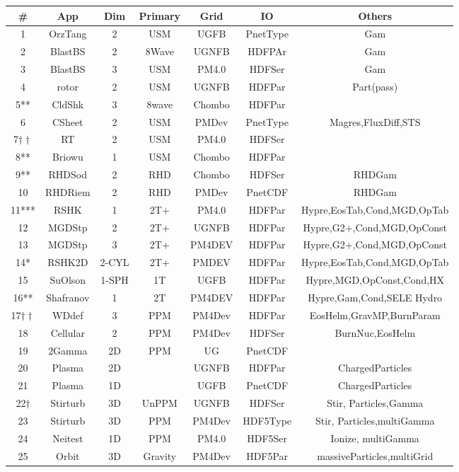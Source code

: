 \documentclass[10pt]{article}
\begin{document}
\begin{tabular}{|c|c|c|c|c|c|c|}\hline
\# &App&Dim&Primary&Grid&IO&Others\\\hline
1&OrzTang&2&USM&UGFB&PnetType&Gam\\\hline
2&BlastBS&2&8Wave&UGNFB&HDFPAr&Gam\\\hline
3&BlastBS&3&USM&PM4.0&HDFSer&Gam\\\hline
4&rotor&2&USM&UGNFB&HDFPar&Part(pass)\\\hline
5**&CldShk&3&8wave&Chombo&HDFPar&\\\hline
6&CSheet&2&USM&PMDev&PnetType&Magres,FluxDiff,STS\\\hline
7$\dagger\dagger$&RT&2&USM&PM4.0&HDFSer&\\\hline
8**&Briowu&1&USM&Chombo&HDFPar&\\\hline
9**&RHDSod&2&RHD&Chombo&HDFSer&RHDGam\\\hline
10&RHDRiem&2&RHD&PMDev&PnetCDF&RHDGam\\\hline
11***&RSHK&1&2T+&PM4.0&HDFPar&Hypre,EosTab,Cond,MGD,OpTab\\\hline
12&MGDStp&2&2T+&UGNFB&HDFPar&Hypre,G2+,Cond,MGD,OpConst\\\hline
13&MGDStp&3&2T+&PM4DEV&HDFPar&Hypre,G2+,Cond,MGD,OpConst\\\hline
14*&RSHK2D&2-CYL&2T+&PMDEV&HDFPar&Hypre,EosTab,Cond,MGD,OpTab\\\hline
15&SuOlson&1-SPH&1T&UGFB&HDFPar&Hypre,MGD,OpConst,Cond,HX\\\hline
16**&Shafranov&1&2T&PM4DEV&HDFPar&Hypre,Gam,Cond,SELE Hydro\\\hline
17$\dagger\dagger$&WDdef&3&PPM&PM4Dev& HDFPar& EosHelm,GravMP,BurnParam\\\hline
18 & Cellular & 2 & PPM & PM4Dev & HDFSer & BurnNuc,EosHelm \\\hline
19&2Gamma&2D &PPM & UG & PnetCDF & \\\hline
20&Plasma&2D && UGNFB & HDFPar &ChargedParticles \\\hline
21&Plasma&1D && UGFB & PnetCDF &ChargedParticles \\\hline
22$\dagger$&Stirturb&3D &UnPPM& UGNFB & HDFSer &Stir, Particles,Gamma \\\hline
23&Stirturb&3D &PPM& PM4Dev & HDF5Type &Stir, Particles,multiGamma \\\hline
24&Neitest&1D &PPM& PM4.0 & HDF5Ser &Ionize, multiGamma \\\hline
25&Orbit&3D &Gravity& PM4Dev & HDF5Par &massiveParticles,multiGrid \\\hline

\end{tabular}
\end{document}
